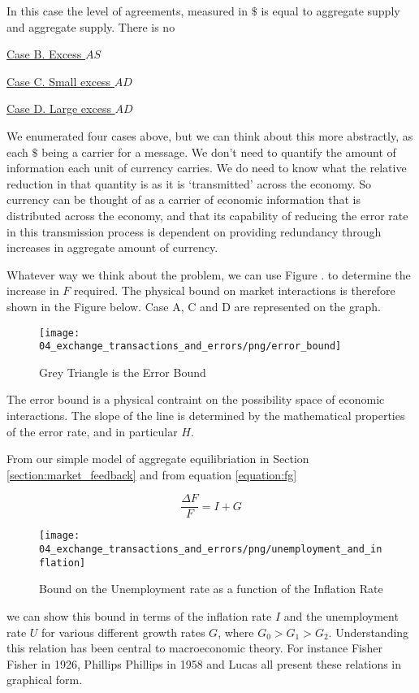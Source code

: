 In this case the level of agreements, measured in $\$$ is equal to aggregate supply and aggregate
supply. There is no  

\underline{Case B. Excess $AS$}

\underline{Case C. Small excess $AD$}

\underline{Case D. Large excess $AD$}

We enumerated four cases above, but we can think about this more abstractly, as each $\$$ being a
carrier for a message. We don't need to quantify the amount of information each unit of currency
carries. We do need to know what the relative reduction in that quantity is as it is `transmitted'
across the economy. So currency can be thought of as a carrier of economic information that is
distributed across the economy, and that its capability of reducing the error rate in this
transmission process is dependent on providing redundancy through increases in aggregate amount of
currency.

Whatever way we think about the problem, we can use Figure \label{fig:shannons_proof}. to determine the
increase in $F$ required. The physical bound on market interactions is therefore shown in the Figure
below. Case A, C and D are represented on the graph.

\begin{figure}[H]
\centering
\texttt{[image: 04\_exchange\_transactions\_and\_errors/png/error\_bound]}
\caption{Grey Triangle is the Error Bound}
\label{fig:error_bound}
\end{figure}

The error bound is a physical contraint on the possibility space of economic interactions. The slope
of the line is determined by the mathematical properties of the error rate, and in particular $H$.

From our simple model of aggregate equilibriation in Section \ref{section:market_feedback} and from
equation \ref{equation:fg}

\begin{equation}
    \frac {\Delta F} F = I + G
\end{equation}

\begin{figure}[H]
\centering
\texttt{[image: 04\_exchange\_transactions\_and\_errors/png/unemployment\_and\_inflation]}
\caption{Bound on the Unemployment rate as a function of the Inflation Rate}
\label{fig:ui_bound}
\end{figure}

we can show this bound in terms of the inflation
rate $I$ and the unemployment rate $U$ for various different growth rates $G$, where $G_0 > G_1 >
G_2$. Understanding this relation has been central to macroeconomic theory. For instance Fisher
Fisher \cite{fisher1926} in 1926, Phillips Phillips \cite{phillips1958} in 1958 and Lucas
\cite{lucas1996} all present these relations in graphical form.

